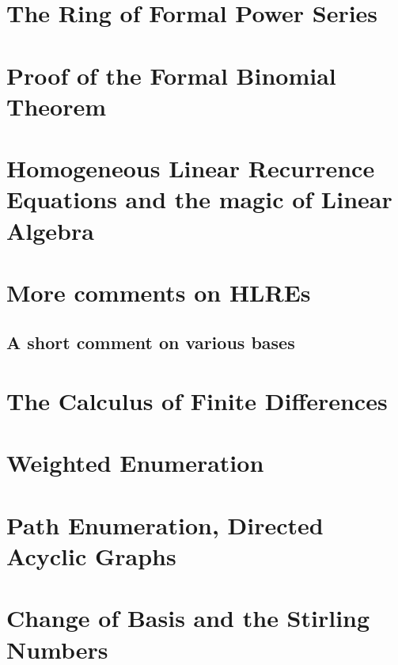 




\section{The Ring of Formal Power Series}

\section{Proof of the Formal Binomial Theorem}



\section{Homogeneous Linear Recurrence Equations and the magic of Linear Algebra}

\section{More comments on HLREs}

\subsection{A short comment on various bases}

\section{The Calculus of Finite Differences}

\section{Weighted Enumeration}

\section{Path Enumeration, Directed Acyclic Graphs}

\section{Change of Basis and the Stirling Numbers}


